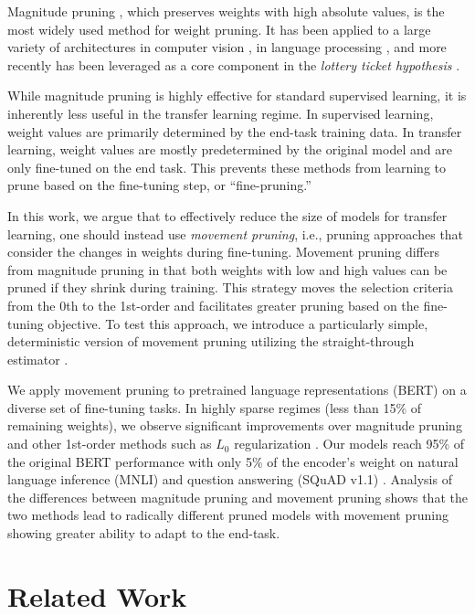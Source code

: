 \documentclass{article}
\begin{document}
Magnitude pruning \citep{Han2015LearningBW, Han2016DeepCC}, which preserves weights with high absolute values, is the most widely used method for weight pruning. It has been applied to a large variety of architectures in computer vision \citep{Guo2016DynamicNS}, in language processing \citep{Gale2019TheSO}, and more recently has been leveraged as a core component in the \textit{lottery ticket hypothesis} \citep{Frankle2019LinearMC}.

While magnitude pruning is highly effective for standard supervised learning, it is inherently less useful in the transfer learning regime. In supervised learning, weight values are primarily determined by the end-task training data. In transfer learning, weight values are mostly predetermined by the original model and are only fine-tuned on the end task. This prevents these methods from learning to prune based on the fine-tuning step, or ``fine-pruning.''

In this work, we argue that to effectively reduce the size of models for transfer learning, one should instead use \textit{movement pruning}, i.e., pruning approaches that consider the changes in weights during fine-tuning. Movement pruning differs from magnitude pruning in that both weights with low and high values can be pruned if they shrink during training. This strategy moves the selection criteria from the 0th to the 1st-order and facilitates greater pruning based on the fine-tuning objective. To test this approach, we introduce a particularly simple, deterministic version of movement pruning utilizing the straight-through estimator \citep{Bengio2013EstimatingOP}. 

We apply movement pruning to pretrained language representations (BERT) \citep{devlin-etal-2019-bert,Vaswani2017AttentionIA} on a diverse set of fine-tuning tasks. In highly sparse regimes (less than 15\% of remaining weights), we observe significant improvements over magnitude pruning and other 1st-order methods such as $L_0$ regularization \citep{Louizos2017LearningSN}. Our models reach 95\% of the original BERT performance with only 5\% of the encoder's weight on natural language inference (MNLI) \citep{N18-1101} and question answering (SQuAD v1.1) \citep{Rajpurkar2016SQuAD10}. Analysis of the differences between magnitude pruning and movement pruning shows that the two methods lead to radically different pruned models with movement pruning showing greater ability to adapt to the end-task.



\section{Related Work}
\end{document}
